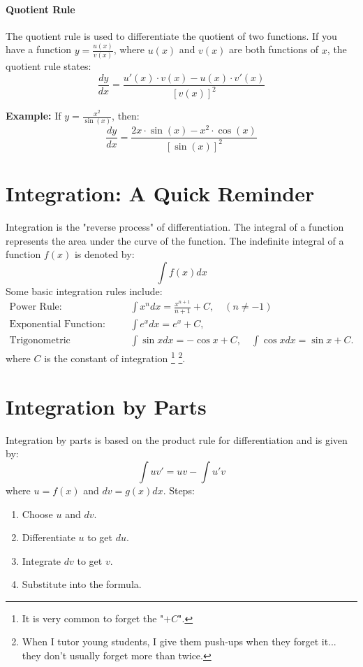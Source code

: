 \documentclass[]{article}
\begin{document}
	\paragraph{Quotient Rule}
	The quotient rule is used to differentiate the quotient of two functions.
	If you have a function $y = \frac{u(x)}{v(x)}$, where $u(x)$ and $v(x)$ are both functions of $x$, the quotient rule states:
	$$
	\frac{dy}{dx} = \frac{u'(x) \cdot v(x) - u(x) \cdot v'(x)}{[v(x)]^2}
	$$
	
	\noindent \textbf{Example:}
	If $y = \frac{x^2}{\sin(x)}$, then:
	$$
	\frac{dy}{dx} = \frac{2x \cdot \sin(x) - x^2 \cdot \cos(x)}{[\sin(x)]^2}
	$$
	
	\section{Integration: A Quick Reminder}
	Integration is the "reverse process" of differentiation.
	The integral of a function represents the area under the curve of the function.
	The indefinite integral of a function $f(x)$ is denoted by:
	$$
	\int f(x) dx
	$$
	Some basic integration rules include:
	\begin{align*}
		\text{Power Rule:} & \quad \int x^n dx = \frac{x^{n+1}}{n+1} + C, \quad (n \neq -1) \\
		\text{Exponential Function:} & \quad \int e^x dx = e^x + C, \\
		\text{Trigonometric Functions:} & \quad \int \sin x dx = -\cos x + C, \quad \int \cos x dx = \sin x + C.
	\end{align*}
	where $C$ is the constant of integration
	\footnote{It is very common to forget the "$+C$".}
	\footnote{When I tutor young students, I give them push-ups when they forget it... they don't usually forget more than twice.}.
		
	\section{Integration by Parts}
	Integration by parts is based on the product rule for differentiation and is given by:
	$$
	\int u v' = uv - \int u' v
	$$
	where $u = f(x)$ and $dv = g(x) dx$. Steps:
	\begin{enumerate}
		\item Choose $u$ and $dv$.
		\item Differentiate $u$ to get $du$.
		\item Integrate $dv$ to get $v$.
		\item Substitute into the formula.
	\end{enumerate}
	
\end{document}
